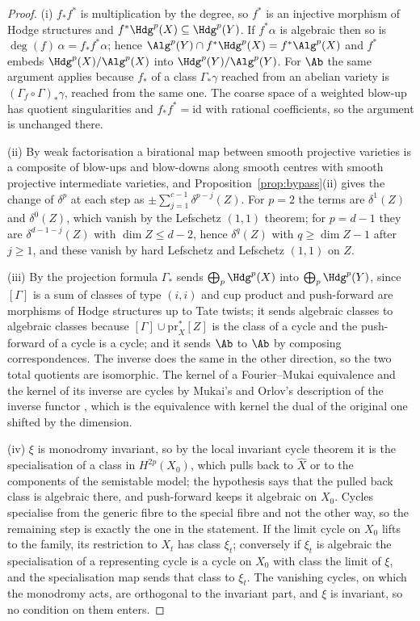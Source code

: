 \begin{proof}
(i) $f_{*}f^{*}$ is multiplication by the degree, so $f^{*}$ is an injective morphism of Hodge structures and $f^{*}\Hdg^{p}(X)\subseteq\Hdg^{p}(Y)$. If $f^{*}\alpha$ is algebraic then so is $\deg(f)\,\alpha=f_{*}f^{*}\alpha$; hence $\Alg^{p}(Y)\cap f^{*}\Hdg^{p}(X)=f^{*}\Alg^{p}(X)$ and $f^{*}$ embeds $\Hdg^{p}(X)/\Alg^{p}(X)$ into $\Hdg^{p}(Y)/\Alg^{p}(Y)$. For $\Ab$ the same argument applies because $f_{*}$ of a class $\Gamma_{*}\gamma$ reached from an abelian variety is $(\Gamma_{f}\circ\Gamma)_{*}\gamma$, reached from the same one. The coarse space of a weighted blow-up has quotient singularities and $f_{*}f^{*}=\mathrm{id}$ with rational coefficients, so the argument is unchanged there.

(ii) By weak factorisation \cite{AKMW02} a birational map between smooth projective varieties is a composite of blow-ups and blow-downs along smooth centres with smooth projective intermediate varieties, and Proposition~\ref{prop:bypass}(ii) gives the change of $\delta^{p}$ at each step as $\pm\sum_{j=1}^{c-1}\delta^{p-j}(Z)$. For $p=2$ the terms are $\delta^{1}(Z)$ and $\delta^{0}(Z)$, which vanish by the Lefschetz $(1,1)$ theorem; for $p=d-1$ they are $\delta^{d-1-j}(Z)$ with $\dim Z\le d-2$, hence $\delta^{q}(Z)$ with $q\ge\dim Z-1$ after $j\ge1$, and these vanish by hard Lefschetz and Lefschetz $(1,1)$ on $Z$.

(iii) By the projection formula $\Gamma_{*}$ sends $\bigoplus_{p}\Hdg^{p}(X)$ into $\bigoplus_{p}\Hdg^{p}(Y)$, since $[\Gamma]$ is a sum of classes of type $(i,i)$ and cup product and push-forward are morphisms of Hodge structures up to Tate twists; it sends algebraic classes to algebraic classes because $[\Gamma]\cup\mathrm{pr}_{X}^{*}[Z]$ is the class of a cycle and the push-forward of a cycle is a cycle; and it sends $\Ab$ to $\Ab$ by composing correspondences. The inverse does the same in the other direction, so the two total quotients are isomorphic. The kernel of a Fourier--Mukai equivalence and the kernel of its inverse are cycles by Mukai's and Orlov's description of the inverse functor \cite{Orl97}, which is the equivalence with kernel the dual of the original one shifted by the dimension.

(iv) $\xi$ is monodromy invariant, so by the local invariant cycle theorem it is the specialisation of a class in $H^{2p}(X_{0})$, which pulls back to $\hat X$ or to the components of the semistable model; the hypothesis says that the pulled back class is algebraic there, and push-forward keeps it algebraic on $X_{0}$. Cycles specialise from the generic fibre to the special fibre \cite[Ch.~20]{Ful98} and not the other way, so the remaining step is exactly the one in the statement. If the limit cycle on $X_{0}$ lifts to the family, its restriction to $X_{t}$ has class $\xi_{t}$; conversely if $\xi_{t}$ is algebraic the specialisation of a representing cycle is a cycle on $X_{0}$ with class the limit of $\xi$, and the specialisation map sends that class to $\xi_{t}$. The vanishing cycles, on which the monodromy acts, are orthogonal to the invariant part, and $\xi$ is invariant, so no condition on them enters.
\end{proof}

